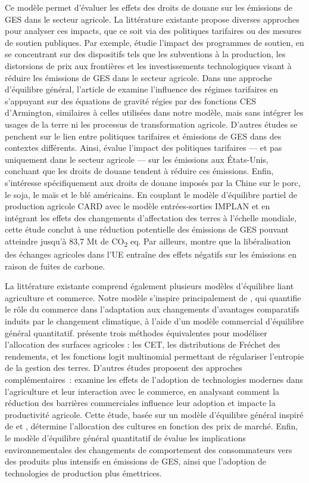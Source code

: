 Ce modèle permet d'évaluer les effets des droits de douane sur les émissions de GES dans le secteur agricole. La littérature existante propose diverses approches pour analyser ces impacts, que ce soit via des politiques tarifaires ou des mesures de soutien publiques. Par exemple, \cite{Laborde2020} étudie l’impact des programmes de soutien, en se concentrant sur des dispositifs tels que les subventions à la production, les distorsions de prix aux frontières et les investissements technologiques visant à réduire les émissions de GES dans le secteur agricole. Dans une approche d'équilibre général, l'article de \cite{Shin2025} examine l'influence des régimes tarifaires en s'appuyant sur des équations de gravité régies par des fonctions CES d’Armington, similaires à celles utilisées dans notre modèle, mais sans intégrer les usages de la terre ni les processus de transformation agricole. D'autres études se penchent sur le lien entre politiques tarifaires et émissions de GES dans des contextes différents. Ainsi, \cite{Cary2020} évalue l’impact des politiques tarifaires — et pas uniquement dans le secteur agricole — sur les émissions aux États-Unis, concluant que les droits de douane tendent à réduire ces émissions. Enfin, \cite{Elobeid2021} s'intéresse spécifiquement aux droits de douane imposés par la Chine sur le porc, le soja, le maïs et le blé américains. En couplant le modèle d'équilibre partiel de production agricole CARD avec le modèle entrées-sorties IMPLAN et en intégrant les effets des changements d'affectation des terres à l'échelle mondiale, cette étude conclut à une réduction potentielle des émissions de GES pouvant atteindre jusqu'à 83,7 Mt de CO\textsubscript{2} eq. Par ailleurs, \cite{Himics2018} montre que la libéralisation des échanges agricoles dans l'UE entraîne des effets négatifs sur les émissions en raison de fuites de carbone.

La littérature existante comprend également plusieurs modèles d'équilibre liant agriculture et commerce. Notre modèle s'inspire principalement de \cite{Gouel2021}, qui quantifie le rôle du commerce dans l'adaptation aux changements d'avantages comparatifs induits par le changement climatique, à l'aide d'un modèle commercial d'équilibre général quantitatif. \cite{Gouel202x} présente trois méthodes équivalentes pour modéliser l'allocation des surfaces agricoles : les CET, les distributions de Fréchet des rendements, et les fonctions logit multinomial permettant de régulariser l'entropie de la gestion des terres. D'autres études proposent des approches complémentaires~: \cite{Farrokhi2023} examine les effets de l'adoption de technologies modernes dans l'agriculture et leur interaction avec le commerce, en analysant comment la réduction des barrières commerciales influence leur adoption et impacte la productivité agricole. Cette étude, basée sur un modèle d'équilibre général inspiré de \cite{Costinot2016} et \cite{Sotelo2020}, détermine l'allocation des cultures en fonction des prix de marché. Enfin, le modèle d'équilibre général quantitatif de \cite{CorreaDias2025} évalue les implications environnementales des changements de comportement des consommateurs vers des produits plus intensifs en émissions de GES, ainsi que l'adoption de technologies de production plus émettrices.

